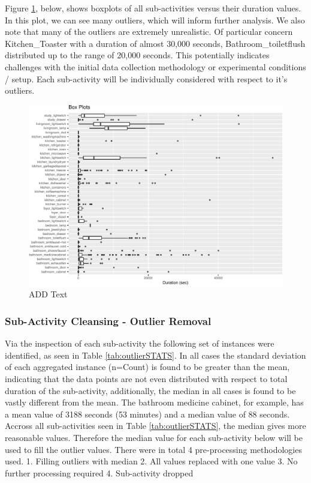 \documentclass[11pt,]{article}
\begin{document}
Figure \ref{fig:FIG_allBoxPlots}, below, shows boxplots of all
sub-activities versus their duration values. In this plot, we can see
many outliers, which will inform further analysis. We also note that
many of the outliers are extremely unrealistic. Of particular concern
Kitchen\_Toaster with a duration of almost 30,000 seconds,
Bathroom\_toiletflush distributed up to the range of 20,000 seconds.
This potentially indicates challenges with the initial data collection
methodology or experimental conditions / setup. Each sub-activity will
be individually considered with respect to it's outliers.

\begin{figure}[H]

{\centering \includegraphics{MD_Final_files/figure-latex/FIG_allBoxPlots-1} 

}

\caption{ADD Text}\label{fig:FIG_allBoxPlots}
\end{figure}

\hypertarget{sub-activity-cleansing---outlier-removal}{%
\subsubsection{Sub-Activity Cleansing - Outlier
Removal}\label{sub-activity-cleansing---outlier-removal}}

Via the inspection of each sub-activity the following set of instances
were identified, as seen in Table \ref{tab:outlierSTATS}. In all cases
the standard deviation of each aggregated instance (n=Count) is found to
be greater than the mean, indicating that the data points are not even
distributed with respect to total duration of the sub-activity,
additionally, the median in all cases is found to be vastly different
from the mean. The bathroom medicine cabinet, for example, has a mean
value of 3188 seconds (53 minutes) and a median value of 88 seconds.
Accross all sub-activities seen in Table \ref{tab:outlierSTATS}, the
median gives more reasonable values. Therefore the median value for each
sub-activity below will be used to fill the outlier values. There were
in total 4 pre-processing methodologies used. 1. Filling outliers with
median 2. All values replaced with one value 3. No further processing
required 4. Sub-activity dropped
\end{document}
